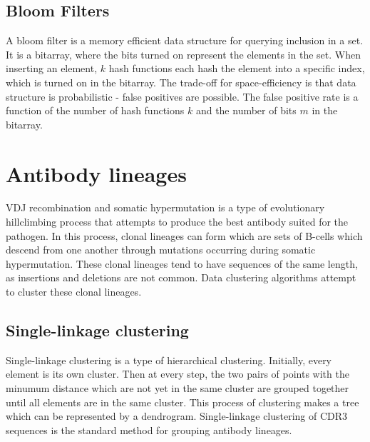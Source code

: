 \documentclass[times, twoside, watermark]{zHenriquesLab-StyleBioRxiv}
\begin{document}
\subsection*{Bloom Filters}
A bloom filter is a memory efficient data structure for querying inclusion in a set. It is a bitarray, where the bits turned on represent the elements in the set. When inserting an element, $k$ hash functions each hash the element into a specific index, which is turned on in the bitarray. The trade-off for space-efficiency is that data structure is probabilistic - false positives are possible. The false positive rate is a function of the number of hash functions $k$ and the number of bits $m$ in the bitarray. \cite{BloomFilters}

\section*{Antibody lineages}

VDJ recombination and somatic hypermutation is a type of evolutionary hillclimbing process that attempts to produce the best antibody suited for the pathogen. In this process, clonal lineages can form which are sets of B-cells which descend from one another through mutations occurring during somatic hypermutation. These clonal lineages tend to have sequences of the same length, as insertions and deletions are not common. Data clustering algorithms attempt to cluster these clonal lineages. 


\subsection*{Single-linkage clustering}
Single-linkage clustering is a type of hierarchical clustering. Initially, every element is its own cluster. Then at every step, the two pairs of points with the minumum distance which are not yet in the same cluster are grouped together until all elements are in the same cluster. This process of clustering makes a tree which can be represented by a dendrogram. Single-linkage clustering of CDR3 sequences is the standard method for grouping antibody lineages. \cite{singleLinkage} 
\end{document}
